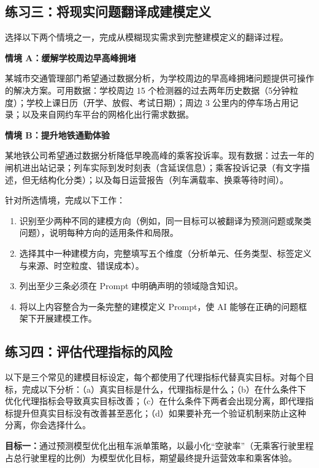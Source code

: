 \subsection*{练习三：将现实问题翻译成建模定义}

选择以下两个情境之一，完成从模糊现实需求到完整建模定义的翻译过程。

\textbf{情境 A：缓解学校周边早高峰拥堵}

某城市交通管理部门希望通过数据分析，为学校周边的早高峰拥堵问题提供可操作的解决方案。可用数据：学校周边 15 个检测器的过去两年历史数据（5分钟粒度）；学校上课日历（开学、放假、考试日期）；周边 3 公里内的停车场占用记录；以及来自网约车平台的网格化出行需求数据。

\textbf{情境 B：提升地铁通勤体验}

某地铁公司希望通过数据分析降低早晚高峰的乘客投诉率。现有数据：过去一年的闸机进出站记录；列车实际到发时刻表（含延误信息）；乘客投诉记录（有文字描述，但无结构化分类）；以及每日运营报告（列车满载率、换乘等待时间）。

针对所选情境，完成以下工作：

\begin{enumerate}
  \item 识别至少两种不同的建模方向（例如，同一目标可以被翻译为预测问题或聚类问题），说明每种方向的适用条件和局限。
  \item 选择其中一种建模方向，完整填写五个维度（分析单元、任务类型、标签定义与来源、时空粒度、错误成本）。
  \item 列出至少三条必须在 Prompt 中明确声明的领域隐含知识。
  \item 将以上内容整合为一条完整的建模定义 Prompt，使 AI 能够在正确的问题框架下开展建模工作。
\end{enumerate}

\subsection*{练习四：评估代理指标的风险}

以下是三个常见的建模目标设定，每个都使用了代理指标代替真实目标。对每个目标，完成以下分析：（a）真实目标是什么，代理指标是什么；（b）在什么条件下优化代理指标会导致真实目标改善；（c）在什么条件下两者会出现分离，即代理指标提升但真实目标没有改善甚至恶化；（d）如果要补充一个验证机制来防止这种分离，你会选择什么。

\smallskip
\textbf{目标一：}通过预测模型优化出租车派单策略，以最小化“空驶率”（无乘客行驶里程占总行驶里程的比例）为模型优化目标，期望最终提升运营效率和乘客体验。

